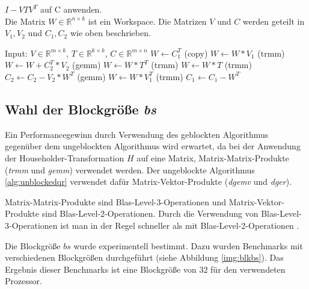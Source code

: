 \begin{algorithm}[H]
	\caption{$I - V T V^T$ auf C anwenden.\\
			 Die Matrix $W \in \mathbb{R}^{n \times k}$ ist ein Workspace. Die Matrizen $V$ und $C$ werden geteilt in $V_1, V_2$ und $C_1,C_2$ wie oben beschrieben.}
	\label{alg:applyblockref}
	\begin{algorithmic}[1]
		\State Input: $V \in \mathbb{R}^{m \times k}$, $T \in \mathbb{R}^{k \times k}$, $C \in \mathbb{R}^{m \times n}$
		\State 	$W \leftarrow C_1^T$ (copy) \label{alg4:beg}
		\State	$W \leftarrow W * V_1 $ (trmm)
			\State $W \leftarrow W + C_2^T*V_2$ (gemm)
		\EndIf \label{alg4:end}
		 \label{alg4:trans}
			\State 	$ W \leftarrow W * T^T$ (trmm)
		\Else
			\State 	$  W \leftarrow W * T$ (trmm)
		\EndIf \label{alg4:transE}
			\State $C_2 \leftarrow C_2 - V_2 * W^T$ (gemm) \label{alg4:C2}
		\EndIf
		\State 	$ W \leftarrow W * V_1^T $ (trmm) \label{alg4:C1}
		\State 	$ C_1 \leftarrow C_1 - W^T $ \label{alg4:C12}
	\end{algorithmic}
\end{algorithm}


\subsection{Wahl der Blockgröße \textit{bs}} \label{bs}

Ein Performancegewinn durch Verwendung des geblockten Algorithmus gegenüber dem ungeblockten Algorithmus wird erwartet, da bei der Anwendung der Householder-Transformation $H$ auf eine Matrix,  Matrix-Matrix-Produkte (\textit{trmm} und \textit{gemm}) verwendet werden. 
Der ungeblockte Algorithmus \ref{alg:unblockedqr} verwendet dafür  Matrix-Vektor-Produkte (\textit{dgemv} und \textit{dger}).

Matrix-Matrix-Produkte sind Blas-Level-3-Operationen und
Matrix-Vektor-Produkte sind Blas-Level-2-Operationen.
Durch die Verwendung von Blas-Level-3-Operationen ist man in der Regel schneller als mit Blas-Level-2-Operationen \cite{HPC1}.

Die Blockgröße $bs$ wurde experimentell bestimmt. Dazu wurden Benchmarks mit verschiedenen Blockgrößen durchgeführt (siehe Abbildung \ref{img:blkbs}).
Das Ergebnis dieser Benchmarks ist eine Blockgröße von $32$ für den verwendeten Prozessor.




